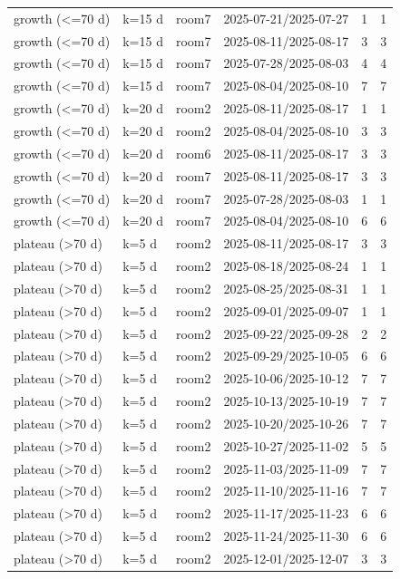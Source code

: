 \begin{tabular}{llllll}
growth (<=70 d) & k=15 d & room7 & 2025-07-21/2025-07-27 & 1 & 1 \\
growth (<=70 d) & k=15 d & room7 & 2025-08-11/2025-08-17 & 3 & 3 \\
growth (<=70 d) & k=15 d & room7 & 2025-07-28/2025-08-03 & 4 & 4 \\
growth (<=70 d) & k=15 d & room7 & 2025-08-04/2025-08-10 & 7 & 7 \\
growth (<=70 d) & k=20 d & room2 & 2025-08-11/2025-08-17 & 1 & 1 \\
growth (<=70 d) & k=20 d & room2 & 2025-08-04/2025-08-10 & 3 & 3 \\
growth (<=70 d) & k=20 d & room6 & 2025-08-11/2025-08-17 & 3 & 3 \\
growth (<=70 d) & k=20 d & room7 & 2025-08-11/2025-08-17 & 3 & 3 \\
growth (<=70 d) & k=20 d & room7 & 2025-07-28/2025-08-03 & 1 & 1 \\
growth (<=70 d) & k=20 d & room7 & 2025-08-04/2025-08-10 & 6 & 6 \\
plateau (>70 d) & k=5 d & room2 & 2025-08-11/2025-08-17 & 3 & 3 \\
plateau (>70 d) & k=5 d & room2 & 2025-08-18/2025-08-24 & 1 & 1 \\
plateau (>70 d) & k=5 d & room2 & 2025-08-25/2025-08-31 & 1 & 1 \\
plateau (>70 d) & k=5 d & room2 & 2025-09-01/2025-09-07 & 1 & 1 \\
plateau (>70 d) & k=5 d & room2 & 2025-09-22/2025-09-28 & 2 & 2 \\
plateau (>70 d) & k=5 d & room2 & 2025-09-29/2025-10-05 & 6 & 6 \\
plateau (>70 d) & k=5 d & room2 & 2025-10-06/2025-10-12 & 7 & 7 \\
plateau (>70 d) & k=5 d & room2 & 2025-10-13/2025-10-19 & 7 & 7 \\
plateau (>70 d) & k=5 d & room2 & 2025-10-20/2025-10-26 & 7 & 7 \\
plateau (>70 d) & k=5 d & room2 & 2025-10-27/2025-11-02 & 5 & 5 \\
plateau (>70 d) & k=5 d & room2 & 2025-11-03/2025-11-09 & 7 & 7 \\
plateau (>70 d) & k=5 d & room2 & 2025-11-10/2025-11-16 & 7 & 7 \\
plateau (>70 d) & k=5 d & room2 & 2025-11-17/2025-11-23 & 6 & 6 \\
plateau (>70 d) & k=5 d & room2 & 2025-11-24/2025-11-30 & 6 & 6 \\
plateau (>70 d) & k=5 d & room2 & 2025-12-01/2025-12-07 & 3 & 3 \\

\end{tabular}
